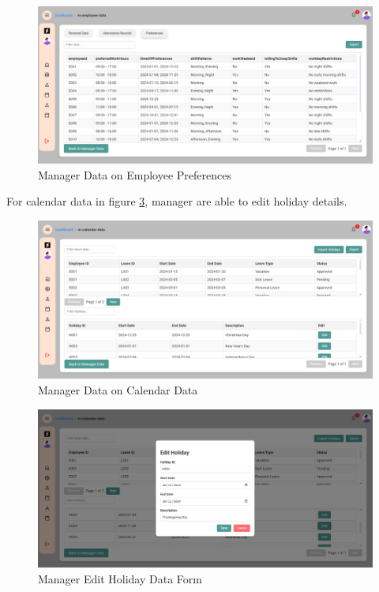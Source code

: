 \documentclass[a4paper,12pt, oneside]{report}
\begin{document}
\begin{itemize}
    \begin{figure}[H]
    \centering
    \includegraphics[width=0.8\columnwidth]{ManagerPages/ManagerEmployeeData8.png}
    \caption{Manager Data on Employee Preferences}
    \label{fig:manager-employee-data-preferences}
    \end{figure}

    For calendar data in figure \ref{fig:manager-calendar-data-form}, manager are able to edit holiday details.
    \begin{figure}[H]
    \centering
    \includegraphics[width=0.8\columnwidth]{ManagerPages/ManagerCalendarData.png}
    \caption{Manager Data on Calendar Data}
    \label{fig:manager-calendar-data}
    \end{figure}

    \begin{figure}[H]
    \centering
    \includegraphics[width=0.8\columnwidth]{ManagerPages/ManagerCalendarData2.png}
    \caption{Manager Edit Holiday Data Form}
    \label{fig:manager-calendar-data-form}
    \end{figure}


\end{itemize}
\end{document}
